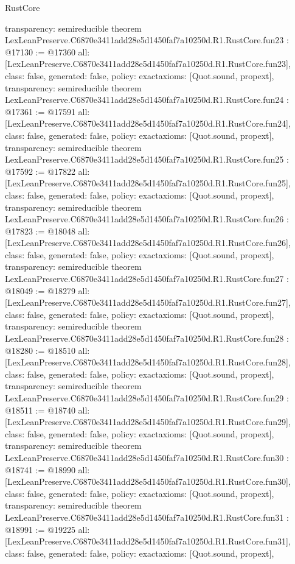 \begin{lexlean}{RustCore}
\begin{coremodule}
{  transparency: semireducible
}
theorem LexLeanPreserve.C6870e3411add28e5d1450faf7a10250d.R1.RustCore.fun23 : @17130 := @17360 {
  all: [LexLeanPreserve.C6870e3411add28e5d1450faf7a10250d.R1.RustCore.fun23],
  class: false,
  generated: false,
  policy: exact{axioms: [Quot.sound, propext]},
  transparency: semireducible
}
theorem LexLeanPreserve.C6870e3411add28e5d1450faf7a10250d.R1.RustCore.fun24 : @17361 := @17591 {
  all: [LexLeanPreserve.C6870e3411add28e5d1450faf7a10250d.R1.RustCore.fun24],
  class: false,
  generated: false,
  policy: exact{axioms: [Quot.sound, propext]},
  transparency: semireducible
}
theorem LexLeanPreserve.C6870e3411add28e5d1450faf7a10250d.R1.RustCore.fun25 : @17592 := @17822 {
  all: [LexLeanPreserve.C6870e3411add28e5d1450faf7a10250d.R1.RustCore.fun25],
  class: false,
  generated: false,
  policy: exact{axioms: [Quot.sound, propext]},
  transparency: semireducible
}
theorem LexLeanPreserve.C6870e3411add28e5d1450faf7a10250d.R1.RustCore.fun26 : @17823 := @18048 {
  all: [LexLeanPreserve.C6870e3411add28e5d1450faf7a10250d.R1.RustCore.fun26],
  class: false,
  generated: false,
  policy: exact{axioms: [Quot.sound, propext]},
  transparency: semireducible
}
theorem LexLeanPreserve.C6870e3411add28e5d1450faf7a10250d.R1.RustCore.fun27 : @18049 := @18279 {
  all: [LexLeanPreserve.C6870e3411add28e5d1450faf7a10250d.R1.RustCore.fun27],
  class: false,
  generated: false,
  policy: exact{axioms: [Quot.sound, propext]},
  transparency: semireducible
}
theorem LexLeanPreserve.C6870e3411add28e5d1450faf7a10250d.R1.RustCore.fun28 : @18280 := @18510 {
  all: [LexLeanPreserve.C6870e3411add28e5d1450faf7a10250d.R1.RustCore.fun28],
  class: false,
  generated: false,
  policy: exact{axioms: [Quot.sound, propext]},
  transparency: semireducible
}
theorem LexLeanPreserve.C6870e3411add28e5d1450faf7a10250d.R1.RustCore.fun29 : @18511 := @18740 {
  all: [LexLeanPreserve.C6870e3411add28e5d1450faf7a10250d.R1.RustCore.fun29],
  class: false,
  generated: false,
  policy: exact{axioms: [Quot.sound, propext]},
  transparency: semireducible
}
theorem LexLeanPreserve.C6870e3411add28e5d1450faf7a10250d.R1.RustCore.fun30 : @18741 := @18990 {
  all: [LexLeanPreserve.C6870e3411add28e5d1450faf7a10250d.R1.RustCore.fun30],
  class: false,
  generated: false,
  policy: exact{axioms: [Quot.sound, propext]},
  transparency: semireducible
}
theorem LexLeanPreserve.C6870e3411add28e5d1450faf7a10250d.R1.RustCore.fun31 : @18991 := @19225 {
  all: [LexLeanPreserve.C6870e3411add28e5d1450faf7a10250d.R1.RustCore.fun31],
  class: false,
  generated: false,
  policy: exact{axioms: [Quot.sound, propext]},
}
\end{coremodule}
\end{lexlean}
